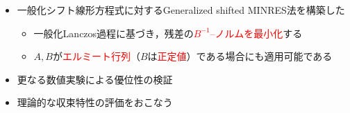 
\begin{itemize}
	\item 一般化シフト線形方程式に対するGeneralized shifted MINRES法を構築した
		\begin{itemize}
			\item 一般化Lanczos過程に基づき，残差の\textcolor{red}{$B^{-1}$--ノルムを最小化}する
			\item $A, B$が\textcolor{red}{エルミート行列}（$B$は\textcolor{red}{正定値}）である場合にも適用可能である
		\end{itemize}
	\item 更なる数値実験による優位性の検証
	\item 理論的な収束特性の評価をおこなう
\end{itemize}